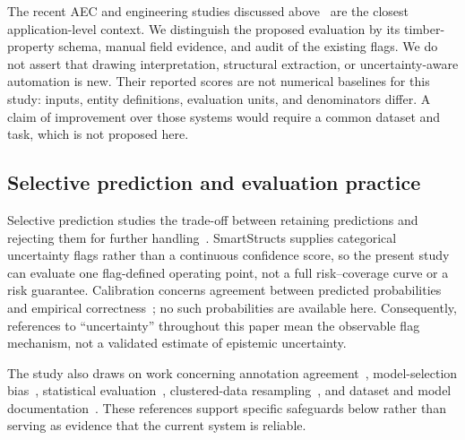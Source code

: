 \documentclass[11pt]{article}
\begin{document}
The recent AEC and engineering studies discussed above~\cite{talebi2026,xu2026,kondratenko2026,kumar2026} are the closest application-level context. We distinguish the proposed evaluation by its timber-property schema, manual field evidence, and audit of the existing flags. We do not assert that drawing interpretation, structural extraction, or uncertainty-aware automation is new. Their reported scores are not numerical baselines for this study: inputs, entity definitions, evaluation units, and denominators differ. A claim of improvement over those systems would require a common dataset and task, which is not proposed here.

\subsection{Selective prediction and evaluation practice}
Selective prediction studies the trade-off between retaining predictions and rejecting them for further handling~\cite{geifman2017}. SmartStructs supplies categorical uncertainty flags rather than a continuous confidence score, so the present study can evaluate one flag-defined operating point, not a full risk--coverage curve or a risk guarantee. Calibration concerns agreement between predicted probabilities and empirical correctness~\cite{guo2017}; no such probabilities are available here. Consequently, references to ``uncertainty'' throughout this paper mean the observable flag mechanism, not a validated estimate of epistemic uncertainty.

The study also draws on work concerning annotation agreement~\cite{artstein2008}, model-selection bias~\cite{cawley2010}, statistical evaluation~\cite{dror2018}, clustered-data resampling~\cite{field2007}, and dataset and model documentation~\cite{gebru2021,mitchell2019}. These references support specific safeguards below rather than serving as evidence that the current system is reliable.
\end{document}
